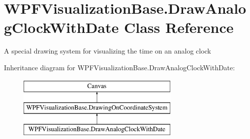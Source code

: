 \hypertarget{class_w_p_f_visualization_base_1_1_draw_analog_clock_with_date}{}\section{W\+P\+F\+Visualization\+Base.\+Draw\+Analog\+Clock\+With\+Date Class Reference}
\label{class_w_p_f_visualization_base_1_1_draw_analog_clock_with_date}


A special drawing system for visualizing the time on an analog clock  


Inheritance diagram for W\+P\+F\+Visualization\+Base.\+Draw\+Analog\+Clock\+With\+Date\+:\begin{figure}[H]
\begin{center}
\leavevmode
\includegraphics[height=3.000000cm]{class_w_p_f_visualization_base_1_1_draw_analog_clock_with_date}
\end{center}
\end{figure}
